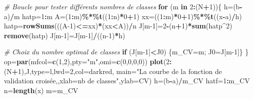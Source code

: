 \documentclass[
  12pt,
]{article}
\newenvironment{Shaded}{\begin{snugshade}}{\end{snugshade}}
\newcommand{\AttributeTok}[1]{\textcolor[rgb]{0.13,0.29,0.53}{#1}}
\newcommand{\CommentTok}[1]{\textcolor[rgb]{0.56,0.35,0.01}{\textit{#1}}}
\newcommand{\ControlFlowTok}[1]{\textcolor[rgb]{0.13,0.29,0.53}{\textbf{#1}}}
\newcommand{\DecValTok}[1]{\textcolor[rgb]{0.00,0.00,0.81}{#1}}
\newcommand{\FunctionTok}[1]{\textcolor[rgb]{0.13,0.29,0.53}{\textbf{#1}}}
\newcommand{\NormalTok}[1]{#1}
\newcommand{\OtherTok}[1]{\textcolor[rgb]{0.56,0.35,0.01}{#1}}
\newcommand{\SpecialCharTok}[1]{\textcolor[rgb]{0.81,0.36,0.00}{\textbf{#1}}}
\newcommand{\StringTok}[1]{\textcolor[rgb]{0.31,0.60,0.02}{#1}}
\begin{document}
\begin{Shaded}
\begin{Highlighting}[]
  \CommentTok{\# Boucle pour tester différents nombres de classes  }
  \ControlFlowTok{for}\NormalTok{ (m }\ControlFlowTok{in} \DecValTok{2}\SpecialCharTok{:}\NormalTok{(N}\SpecialCharTok{+}\DecValTok{1}\NormalTok{))\{}
\NormalTok{    h}\OtherTok{=}\NormalTok{(b}\SpecialCharTok{{-}}\NormalTok{a)}\SpecialCharTok{/}\NormalTok{m}
\NormalTok{    hatp}\OtherTok{=}\DecValTok{1}\SpecialCharTok{:}\NormalTok{m}
\NormalTok{    A}\OtherTok{=}\NormalTok{(}\DecValTok{1}\SpecialCharTok{:}\NormalTok{m)}\SpecialCharTok{\%*\%}\FunctionTok{t}\NormalTok{((}\DecValTok{1}\SpecialCharTok{:}\NormalTok{n)}\SpecialCharTok{*}\DecValTok{0}\SpecialCharTok{+}\DecValTok{1}\NormalTok{)}
\NormalTok{    xx}\OtherTok{=}\NormalTok{((}\DecValTok{1}\SpecialCharTok{:}\NormalTok{m)}\SpecialCharTok{*}\DecValTok{0}\SpecialCharTok{+}\DecValTok{1}\NormalTok{)}\SpecialCharTok{\%*\%}\FunctionTok{t}\NormalTok{((x}\SpecialCharTok{{-}}\NormalTok{a)}\SpecialCharTok{/}\NormalTok{h)}
\NormalTok{    hatp}\OtherTok{=}\FunctionTok{rowSums}\NormalTok{(((A}\DecValTok{{-}1}\NormalTok{)}\SpecialCharTok{\textless{}=}\NormalTok{xx)}\SpecialCharTok{*}\NormalTok{(xx}\SpecialCharTok{\textless{}}\NormalTok{A))}\SpecialCharTok{/}\NormalTok{n}
\NormalTok{    J[m}\DecValTok{{-}1}\NormalTok{]}\OtherTok{=}\DecValTok{2}\SpecialCharTok{{-}}\NormalTok{(n}\SpecialCharTok{+}\DecValTok{1}\NormalTok{)}\SpecialCharTok{*}\FunctionTok{sum}\NormalTok{(hatp}\SpecialCharTok{\^{}}\DecValTok{2}\NormalTok{)}
    \FunctionTok{remove}\NormalTok{(hatp)}
\NormalTok{    J[m}\DecValTok{{-}1}\NormalTok{]}\OtherTok{=}\NormalTok{J[m}\DecValTok{{-}1}\NormalTok{]}\SpecialCharTok{/}\NormalTok{((n}\DecValTok{{-}1}\NormalTok{)}\SpecialCharTok{*}\NormalTok{h)}
    
    \CommentTok{\# Choix du nombre optimal de classes}
    \ControlFlowTok{if}\NormalTok{ (J[m}\DecValTok{{-}1}\NormalTok{]}\SpecialCharTok{\textless{}}\NormalTok{J0) \{m\_CV}\OtherTok{=}\NormalTok{m; J0}\OtherTok{=}\NormalTok{J[m}\DecValTok{{-}1}\NormalTok{]\}}
\NormalTok{  \}}
\NormalTok{  op}\OtherTok{=}\FunctionTok{par}\NormalTok{(}\AttributeTok{mfcol=}\FunctionTok{c}\NormalTok{(}\DecValTok{1}\NormalTok{,}\DecValTok{2}\NormalTok{),}\AttributeTok{pty=}\StringTok{"m"}\NormalTok{,}\AttributeTok{omi=}\FunctionTok{c}\NormalTok{(}\DecValTok{0}\NormalTok{,}\DecValTok{0}\NormalTok{,}\DecValTok{0}\NormalTok{,}\DecValTok{0}\NormalTok{))}
  \FunctionTok{plot}\NormalTok{(}\DecValTok{2}\SpecialCharTok{:}\NormalTok{(N}\SpecialCharTok{+}\DecValTok{1}\NormalTok{),J,}\AttributeTok{type=}\StringTok{\textquotesingle{}l\textquotesingle{}}\NormalTok{,}\AttributeTok{lwd=}\DecValTok{2}\NormalTok{,}\AttributeTok{col=}\StringTok{\textquotesingle{}darkred\textquotesingle{}}\NormalTok{, }
       \AttributeTok{main=}\StringTok{"La courbe de la fonction de validation croisée\textquotesingle{},,xlab=\textquotesingle{}nb de classes"}\NormalTok{,}\AttributeTok{ylab=}\StringTok{\textquotesingle{}CV\textquotesingle{}}\NormalTok{)}
\NormalTok{  h}\OtherTok{=}\NormalTok{(b}\SpecialCharTok{{-}}\NormalTok{a)}\SpecialCharTok{/}\NormalTok{m\_CV}
\NormalTok{  hatf}\OtherTok{=}\DecValTok{1}\SpecialCharTok{:}\NormalTok{m\_CV}
\NormalTok{  n}\OtherTok{=}\FunctionTok{length}\NormalTok{(x)}
\NormalTok{  m}\OtherTok{=}\NormalTok{m\_CV}
  

\end{Highlighting}
\end{Shaded}
\end{document}
